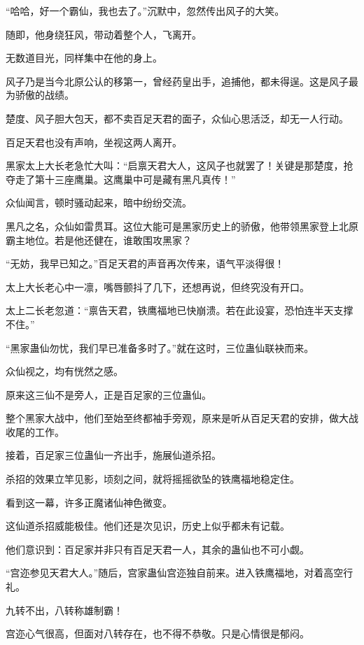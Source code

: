 
\begin{this_body}

“哈哈，好一个霸仙，我也去了。”沉默中，忽然传出风子的大笑。

随即，他身绕狂风，带动着整个人，飞离开。

无数道目光，同样集中在他的身上。

风子乃是当今北原公认的移第一，曾经药皇出手，追捕他，都未得逞。这是风子最为骄傲的战绩。

楚度、风子胆大包天，都不卖百足天君的面子，众仙心思活泛，却无一人行动。

百足天君也没有声响，坐视这两人离开。

黑家太上大长老急忙大叫：“启禀天君大人，这风子也就罢了！关键是那楚度，抢夺走了第十三座鹰巢。这鹰巢中可是藏有黑凡真传！”

众仙闻言，顿时骚动起来，暗中纷纷交流。

黑凡之名，众仙如雷贯耳。这位大能可是黑家历史上的骄傲，他带领黑家登上北原霸主地位。若是他还健在，谁敢围攻黑家？

“无妨，我早已知之。”百足天君的声音再次传来，语气平淡得很！

太上大长老心中一凛，嘴唇颤抖了几下，还想再说，但终究没有开口。

太上二长老忽道：“禀告天君，铁鹰福地已快崩溃。若在此设宴，恐怕连半天支撑不住。”

“黑家蛊仙勿忧，我们早已准备多时了。”就在这时，三位蛊仙联袂而来。

众仙视之，均有恍然之感。

原来这三仙不是旁人，正是百足家的三位蛊仙。

整个黑家大战中，他们至始至终都袖手旁观，原来是听从百足天君的安排，做大战收尾的工作。

接着，百足家三位蛊仙一齐出手，施展仙道杀招。

杀招的效果立竿见影，顷刻之间，就将摇摇欲坠的铁鹰福地稳定住。

看到这一幕，许多正魔诸仙神色微变。

这仙道杀招威能极佳。他们还是次见识，历史上似乎都未有记载。

他们意识到：百足家并非只有百足天君一人，其余的蛊仙也不可小觑。

“宫迩参见天君大人。”随后，宫家蛊仙宫迩独自前来。进入铁鹰福地，对着高空行礼。

九转不出，八转称雄制霸！

宫迩心气很高，但面对八转存在，也不得不恭敬。只是心情很是郁闷。


\end{this_body}
